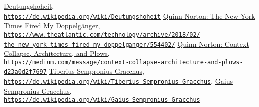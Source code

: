 \documentclass[a4,parindent=0pt]{article}
\begin{document}
\begin{thebibliography}{88}
  \href{https://de.wikipedia.org/wiki/Deutungshoheit}{Deutungshoheit,\\
\texttt{https://de.wikipedia.org/wiki/Deutungshoheit}}
  \href{https://www.theatlantic.com/technology/archive/2018/02/the-new-york-times-fired-my-doppelganger/554402/}{Quinn
  Norton: The New York Times Fired My Doppelgänger,\\
\texttt{https://www.theatlantic.com/technology/archive/2018/02/\\the-new-york-times-fired-my-doppelganger/554402/}}
  \href{https://medium.com/message/context-collapse-architecture-and-plows-d23a0d2f7697}{Quinn Norton: Context Collapse, Architecture, and Plows,\\
\texttt{https://medium.com/message/context-collapse-architecture-and-plows-d23a0d2f7697}}
  \href{https://de.wikipedia.org/wiki/Tiberius_Sempronius_Gracchus}{Tiberius Sempronius Gracchus,\\
\texttt{https://de.wikipedia.org/wiki/Tiberius\_Sempronius\_Gracchus}}, \href{https://de.wikipedia.org/wiki/Gaius_Sempronius_Gracchus}{Gaius Sempronius Gracchus,\\
\texttt{https://de.wikipedia.org/wiki/Gaius\_Sempronius\_Gracchus}}

\end{thebibliography}
\end{document}
